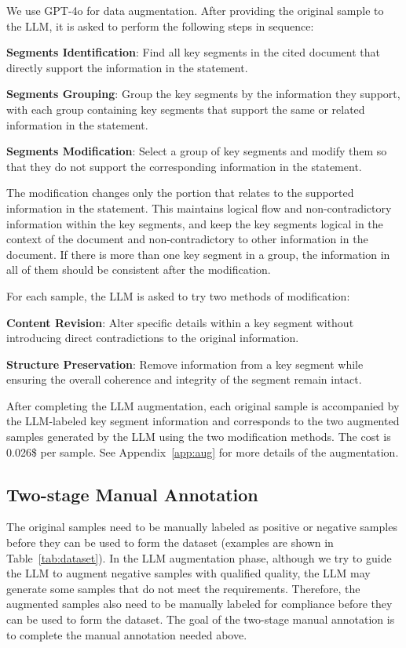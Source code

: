We use GPT-4o \cite{openai2024gpt4technicalreport} for data augmentation. After providing the original sample to the LLM, it is asked to perform the following steps in sequence:

\noindent \textbf{Segments Identification}: Find all key segments in the cited document that directly support the information in the statement.

\noindent \textbf{Segments Grouping}: Group the key segments by the information they support, with each group containing key segments that support the same or related information in the statement.

\noindent \textbf{Segments Modification}: Select a group of key segments and modify them so that they do not support the corresponding information in the statement. 

The modification changes only the portion that relates to the supported information in the statement. This maintains logical flow and non-contradictory information within the key segments, and keep the key segments logical in the context of the document and non-contradictory to other information in the document. If there is more than one key segment in a group, the information in all of them should be consistent after the modification.

For each sample, the LLM is asked to try two methods of modification:

\noindent\textbf{Content Revision}: Alter specific details within a key segment without introducing direct contradictions to the original information.

\noindent \textbf{Structure Preservation}: Remove information from a key segment while ensuring the overall coherence and integrity of the segment remain intact.

After completing the LLM augmentation, each original sample is accompanied by the LLM-labeled key segment information and corresponds to the two augmented samples generated by the LLM using the two modification methods. The cost is 0.026\$ per sample. See Appendix~\ref{app:aug} for more details of the augmentation.


\subsection{Two-stage Manual Annotation}

The original samples need to be manually labeled as positive or negative samples before they can be used to form the dataset (examples are shown in Table~\ref{tab:dataset}). In the LLM augmentation phase, although we try to guide the LLM to augment negative samples with qualified quality, the LLM may generate some samples that do not meet the requirements. Therefore, the augmented samples also need to be manually labeled for compliance before they can be used to form the dataset. The goal of the two-stage manual annotation is to complete the manual annotation needed above.

